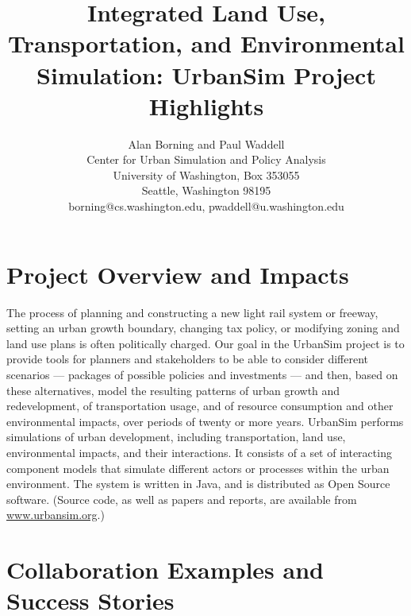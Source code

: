 \documentclass[11pt]{article}
\begin{document}
\title{Integrated Land Use, Transportation, and Environmental Simulation:
UrbanSim Project Highlights}

\author{Alan Borning and Paul Waddell\\
Center for Urban Simulation and Policy Analysis \\
University of Washington, Box 353055 \\
Seattle, Washington 98195 \\
borning@cs.washington.edu, pwaddell@u.washington.edu}

\date{}

\maketitle

\section{Project Overview and Impacts}

The process of planning and constructing a new light rail system or
freeway, setting an urban growth boundary, changing tax policy, or
modifying zoning and land use plans is often politically charged.  Our goal
in the UrbanSim project is to provide tools for planners and stakeholders
to be able to consider different scenarios --- packages of possible
policies and investments --- and then, based on these alternatives, model
the resulting patterns of urban growth and redevelopment, of transportation
usage, and of resource consumption and other environmental impacts, over
periods of twenty or more years.  UrbanSim
\cite{noth-ceus-2003,waddell-nse-2003,waddell-ulfarsson-2004}
performs simulations of urban development, including transportation, land
use, environmental impacts, and their interactions.  It consists of a set
of interacting component models that simulate different actors or processes
within the urban environment.  The system is written in Java, and is
distributed as Open Source software.  (Source code, as well as papers and
reports, are available from \mbox{\url{www.urbansim.org}}.)

\section{Collaboration Examples and Success Stories}
\end{document}
